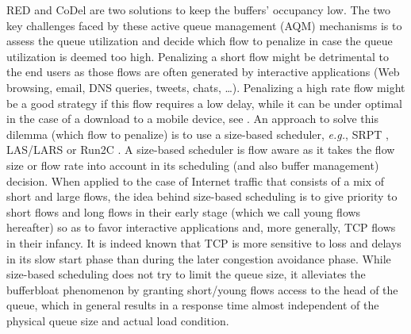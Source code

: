 \documentclass[preprint,12pt]{elsarticle}
\begin{document}
RED and CoDel are two solutions to keep the buffers' occupancy low. 
The two key challenges faced by these active queue management (AQM) mechanisms is to assess the queue utilization and decide which flow to penalize in case the queue utilization is deemed too high. Penalizing a short flow might be detrimental to the end users as those flows are often generated by interactive applications (Web browsing, email, DNS queries, tweets, chats, \ldots). Penalizing a high rate flow might be a good strategy if this flow requires a low delay, while it can be under optimal in the case of a download to a mobile device, see \cite{sivaraman2013no}. An approach to solve this dilemma (which flow to penalize) is to  use a size-based scheduler, \textit{e.g.}, SRPT \cite{kleinrock_76_queueing},  LAS/LARS \cite{Rai02size-basedscheduling,Martin10Lars} or Run2C \cite{Avrachenkov04Run2c}. A size-based scheduler is flow aware as it takes the flow size or flow rate into account in its scheduling (and also buffer management) decision. When applied to the case of Internet traffic that consists of a mix of short and large flows, the idea behind size-based scheduling is to give priority to short flows and long flows in their early stage (which we call young flows hereafter) so as to favor interactive applications and, more generally, TCP flows in their infancy. It is indeed known that TCP is more sensitive to loss and delays in its slow start phase than during the later congestion avoidance phase. While size-based scheduling does not try to limit the queue size, it alleviates the bufferbloat  phenomenon by granting short/young flows access to the head of the queue, which in general results in a response time almost independent of the physical queue size and actual load condition. 
\end{document}
